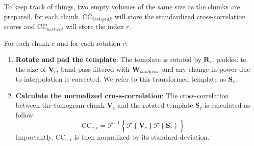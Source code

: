 To keep track of things, two empty volumes of the same size as the chunks are prepared, for each chunk. $\bm{\mathrm{CC}}_{best\text{-}peak}$ will store the standardized cross-correlation scores and $\bm{\mathrm{CC}}_{best\text{-}rot}$ will store the index $r$.

For each chunk $c$ and for each rotation $r$:
\begin{enumerate}
    \item \textbf{Rotate and pad the template}: The template is rotated by $\bm{R}_{r}$, padded to the size of $\bm{V}_c$, band-pass filtered with $\bm{W}_{bandpass}$ and any change in power due to interpolation is corrected. We refer to this transformed template as $\bm{S}_r$.
    
    \item \textbf{Calculate the normalized cross-correlation}: The cross-correlation between the tomogram chunk $\bm{V}_c$ and the rotated template $\bm{S}_r$ is calculated as follow.
    \begin{equation}
        \bm{\mathrm{CC}}_{c,r} =    \mathcal{F}^{-1} \left\{
                                        \mathcal{F} \left\{ \bm{V}_c \right\} \overline{\mathcal{F} \left\{ \bm{S}_r \right\}}
                                    \right\}
    \end{equation}
    Importantly, $\bm{\mathrm{CC}}_{c,r}$ is then normalized by its standard deviation. %
    

\end{enumerate}
